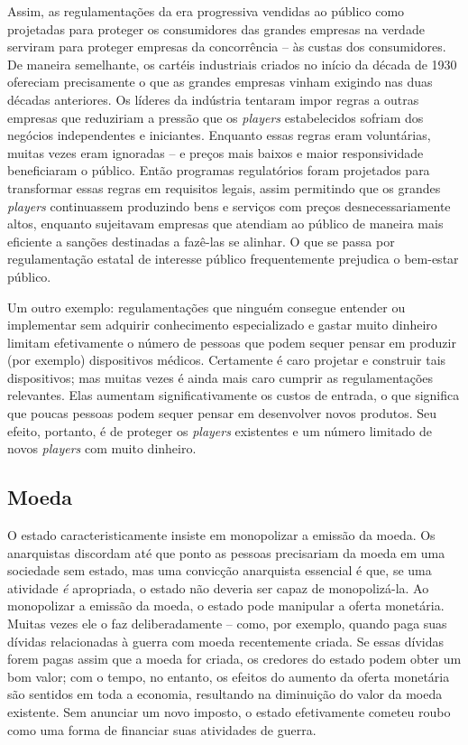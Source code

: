 Assim, as regulamentações da era progressiva vendidas ao público como projetadas para proteger os consumidores das grandes empresas na verdade serviram para proteger empresas da concorrência -- às custas dos consumidores. De maneira semelhante, os cartéis industriais criados no início da década de 1930 ofereciam precisamente o que as grandes empresas vinham exigindo nas duas décadas anteriores. Os líderes da indústria tentaram impor regras a outras empresas que reduziriam a pressão que os \emph{players} estabelecidos sofriam dos negócios independentes e iniciantes. Enquanto essas regras eram voluntárias, muitas vezes eram ignoradas -- e preços mais baixos e maior responsividade beneficiaram o público. Então programas regulatórios foram projetados para transformar essas regras em requisitos legais, assim permitindo que os grandes \emph{players} continuassem produzindo bens e serviços com preços desnecessariamente altos, enquanto sujeitavam empresas que atendiam ao público de maneira mais eficiente a sanções destinadas a fazê-las se alinhar. O que se passa por regulamentação estatal de interesse público frequentemente prejudica o bem-estar público.

Um outro exemplo: regulamentações que ninguém consegue entender ou implementar sem adquirir conhecimento especializado e gastar muito dinheiro limitam efetivamente o número de pessoas que podem sequer pensar em produzir (por exemplo) dispositivos médicos. Certamente é caro projetar e construir tais dispositivos; mas muitas vezes é ainda mais caro cumprir as regulamentações relevantes. Elas aumentam significativamente os custos de entrada, o que significa que poucas pessoas podem sequer pensar em desenvolver novos produtos. Seu efeito, portanto, é de proteger os \emph{players} existentes e um número limitado de novos \emph{players} com muito dinheiro.

\subsection*{Moeda}

O estado caracteristicamente insiste em monopolizar a emissão da moeda. Os anarquistas discordam até que ponto as pessoas precisariam da moeda em uma sociedade sem estado, mas uma convicção anarquista essencial é que, se uma atividade \emph{é} apropriada, o estado não deveria ser capaz de monopolizá-la. Ao monopolizar a emissão da moeda, o estado pode manipular a oferta monetária. Muitas vezes ele o faz deliberadamente -- como, por exemplo, quando paga suas dívidas relacionadas à guerra com moeda recentemente criada. Se essas dívidas forem pagas assim que a moeda for criada, os credores do estado podem obter um bom valor; com o tempo, no entanto, os efeitos do aumento da oferta monetária são sentidos em toda a economia, resultando na diminuição do valor da moeda existente. Sem anunciar um novo imposto, o estado efetivamente cometeu roubo como uma forma de financiar suas atividades de guerra.

